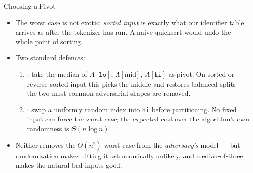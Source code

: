 \documentclass[aspectratio=169]{beamer}
\begin{document}
\begin{frame}{Choosing a Pivot}
  \begin{itemize}
    \item The worst case is not exotic: \emph{sorted input} is exactly what
      our identifier table arrives as after the tokenizer has run. A naive
      quicksort would undo the whole point of sorting.
    \item Two standard defences:
      \begin{enumerate}
        \item {}: take the median of $A[\texttt{lo}]$,
          $A[\text{mid}]$, $A[\texttt{hi}]$ as pivot. On sorted or
          reverse-sorted input this picks the middle and restores balanced
          splits --- the two most common adversarial shapes are removed.
        \item {}: swap a uniformly random index into
          \texttt{hi} before partitioning. No fixed input can force the worst
          case; the expected cost over the algorithm's own randomness is
          $\Theta(n\log n)$.
      \end{enumerate}
    \item Neither removes the $\Theta(n^2)$ worst case from the
      \emph{adversary's} model --- but randomization makes hitting it
      astronomically unlikely, and median-of-three makes the natural bad
      inputs good.
  \end{itemize}
\end{frame}
\end{document}
